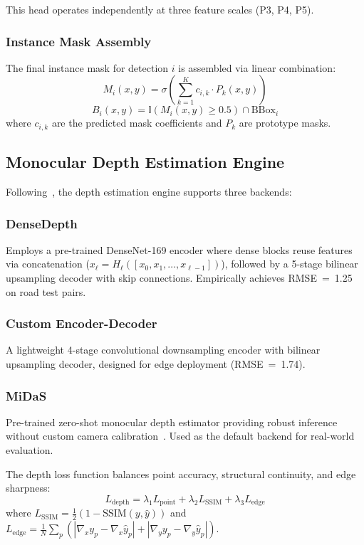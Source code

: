\documentclass[conference]{IEEEtran}
\begin{document}
This head operates independently at three feature scales (P3, P4, P5).

\subsubsection{Instance Mask Assembly}
The final instance mask for detection $i$ is assembled via linear combination:
\begin{equation}
M_i(x,y) = \sigma\left(\sum_{k=1}^{K} c_{i,k} \cdot P_k(x,y)\right)
\label{eq:mask_assembly}
\end{equation}
\begin{equation}
B_i(x,y) = \mathbb{I}\left(M_i(x,y) \geq 0.5\right) \cap \text{BBox}_i
\end{equation}
where $c_{i,k}$ are the predicted mask coefficients and $P_k$ are prototype masks.


\subsection{Monocular Depth Estimation Engine}
\label{sec:depth}

Following~\cite{baroudi2025pothole}, the depth estimation engine supports three backends:

\subsubsection{DenseDepth}
Employs a pre-trained DenseNet-169 encoder where dense blocks reuse features via concatenation ($x_\ell = H_\ell([x_0, x_1, \ldots, x_{\ell-1}])$), followed by a 5-stage bilinear upsampling decoder with skip connections. Empirically achieves RMSE~=~1.25 on road test pairs.

\subsubsection{Custom Encoder-Decoder}
A lightweight 4-stage convolutional downsampling encoder with bilinear upsampling decoder, designed for edge deployment (RMSE~=~1.74).

\subsubsection{MiDaS}
Pre-trained zero-shot monocular depth estimator providing robust inference without custom camera calibration~\cite{ranftl2020midas}. Used as the default backend for real-world evaluation.

The depth loss function balances point accuracy, structural continuity, and edge sharpness:
\begin{equation}
L_{\text{depth}} = \lambda_1 L_{\text{point}} + \lambda_2 L_{\text{SSIM}} + \lambda_3 L_{\text{edge}}
\end{equation}
where $L_{\text{SSIM}} = \frac{1}{2}(1 - \text{SSIM}(y, \hat{y}))$ and $L_{\text{edge}} = \frac{1}{N}\sum_p (|\nabla_x y_p - \nabla_x \hat{y}_p| + |\nabla_y y_p - \nabla_y \hat{y}_p|)$.
\end{document}
